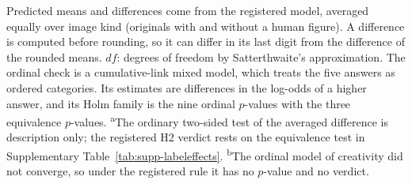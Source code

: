 \begin{table}[htbp]
\smallskip
\begin{minipage}{\textwidth}
\footnotesize\raggedright
Predicted means and differences come from the registered model, averaged equally over image kind (originals with and without a human figure). A difference is computed before rounding, so it can differ in its last digit from the difference of the rounded means. $df$: degrees of freedom by Satterthwaite's approximation. The ordinal check is a cumulative-link mixed model, which treats the five answers as ordered categories. Its estimates are differences in the log-odds of a higher answer, and its Holm family is the nine ordinal $p$-values with the three equivalence $p$-values. \textsuperscript{a}The ordinary two-sided test of the averaged difference is description only; the registered H2 verdict rests on the equivalence test in Supplementary Table~\ref{tab:supp-labeleffects}. \textsuperscript{b}The ordinal model of creativity did not converge, so under the registered rule it has no $p$-value and no verdict.
\end{minipage}
\end{table}
